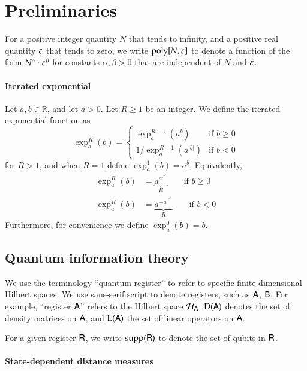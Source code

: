 

\section{Preliminaries}

For a positive integer quantity $N$ that tends to infinity, and a positive real quantity $\varepsilon$ that tends to zero, we write $\operatorname{poly}[N;\varepsilon]$ to denote a function of the form $N^\alpha \cdot \varepsilon^\beta$ for constants $\alpha, \beta > 0$ that are independent of $N$ and $\varepsilon$.

\paragraph{Iterated exponential}
Let $a,b \in \mathbb{R}$, and let $a > 0$. Let $R \geq 1$ be an integer. We define the iterated exponential function as
\[
	\exp^R_a(b) = 
	\left \{ \begin{array}{ll}
		\exp^{R-1}_a(a^b)	& \mbox{if } b \geq 0 \\
		1/\exp^{R-1}_a(a^{|b|}) & \mbox {if } b < 0
	\end{array}
	\right.
\]
for $R > 1$, and when $R=1$ define $\exp^1_a(b) = a^b$. Equivalently, 
\begin{align*}
	\exp^R_a(b) &= \underbrace{a^{a^{\cdot^{\cdot^{a^b}}}}}_{R} \qquad \mbox{if } b \geq 0 \\
	\exp^R_a(b) &= \underbrace{a^{-a^{\cdot^{\cdot^{a^{|b|}}}}}}_{R} \qquad \mbox{if } b < 0
\end{align*}
Furthermore, for convenience we define $\exp^0_a(b) = b$.%

\subsection{Quantum information theory}

We use the terminology ``quantum register'' to refer to specific finite dimensional Hilbert spaces. We use sans-serif script to denote registers, such as ${\mathsf{A}}$, ${\mathsf{B}}$. For example, ``register ${\textsf{A}}$'' refers to the Hilbert space $\mathcal{H}_{{\textsf{A}}}$. 
$\mathrm{D}({\mathsf{A}})$ denotes the set of density matrices on ${\mathsf{A}}$, and $\mathrm{L}({\mathsf{A}})$ the set of linear operators on ${\mathsf{A}}$.

For a given register ${\mathsf{R}}$, we write $\operatorname{supp}({\mathsf{R}})$ to denote the set of qubits in ${\mathsf{R}}$.

\paragraph{State-dependent distance measures}

